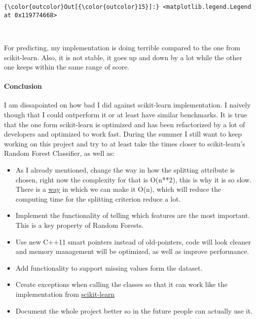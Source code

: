 \documentclass[11pt]{article}
\begin{document}
\begin{Verbatim}[commandchars=\\\{\}]
{\color{outcolor}Out[{\color{outcolor}15}]:} <matplotlib.legend.Legend at 0x119774668>
\end{Verbatim}
            
    \begin{center}
    \end{center}
    { \hspace*{\fill} \\}
    
    For predicting, my implementation is doing terrible compared to the one
from scikit-learn. Also, it is not stable, it goes up and down by a lot
while the other one keeps within the same range of score.

    \paragraph{Conclusion}\label{conclusion}

I am dissapointed on how bad I did against scikit-learn implementation.
I naively though that I could outperform it or at least have similar
benchmarks. It is true that the one form scikit-learn is optimized and
has been refactorized by a lot of developers and optimized to work fast.
During the summer I still want to keep working on this project and try
to at least take the times closer to scikit-learn's Random Forest
Classifier, as well as:

\begin{itemize}
\item
  As I already mentioned, change the way in how the splitting attribute
  is chosen, right now the complexity for that is O(n**2), this is why
  it is so slow. There is a
  \href{https://stats.stackexchange.com/questions/105487/the-efficiency-of-decision-tree}{way}
  in which we can make it O(n), which will reduce the computing time for
  the splitting criterion reduce a lot.
\item
  Implement the functionality of telling which features are the most
  important. This is a key property of Random Forests.
\item
  Use new C++11 smart pointers instead of old-pointers, code will look
  cleaner and memory management will be optimized, as well as improve
  performance.
\item
  Add functionality to support missing values form the dataset.
\item
  Create exceptions when calling the classes so that it can work like
  the implementation from
  \href{http://scikit-learn.org/stable/modules/generated/sklearn.ensemble.RandomForestClassifier.html\#sklearn.ensemble.RandomForestClassifier.predict}{scikit-learn}
\item
  Document the whole project better so in the future people can actually
  use it.
\end{itemize}
\end{document}

